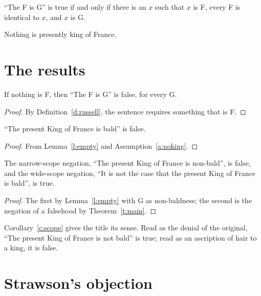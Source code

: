 \documentclass{situationist-preprint}
\begin{document}
\begin{definition}[Russell]\label{d:russell}
\enquote{The F is G} is true if and only if there is an $x$ such that $x$ is F, every F is identical to $x$, and $x$ is G.
\end{definition}

\begin{assumption}\label{a:noking}
Nothing is presently king of France.
\end{assumption}

\section{The results}

\begin{lemma}\label{l:empty}
If nothing is F, then \enquote{The F is G} is false, for every G.
\end{lemma}

\begin{proof}
By Definition~\ref{d:russell}, the sentence requires something that is F.
\end{proof}

\begin{theorem}\label{t:main}
\enquote{The present King of France is bald} is false.
\end{theorem}

\begin{proof}
From Lemma~\ref{l:empty} and Assumption~\ref{a:noking}.
\end{proof}

\begin{corollary}\label{c:scope}
The narrow-scope negation, \enquote{The present King of France is non-bald}, is false, and the wide-scope negation, \enquote{It is not the case that the present King of France is bald}, is true.
\end{corollary}

\begin{proof}
The first by Lemma~\ref{l:empty} with G as non-baldness; the second is the negation of a falsehood by Theorem~\ref{t:main}.
\end{proof}

Corollary~\ref{c:scope} gives the title its sense. Read as the denial of the original, \enquote{The present King of France is not bald} is true; read as an ascription of hair to a king, it is false.

\section{Strawson's objection}
\end{document}
